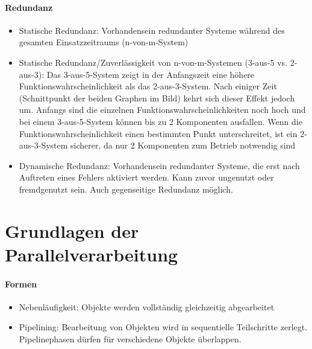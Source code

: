 	\paragraph{Redundanz}
		\begin{itemize}
			\item Statische Redundanz: Vorhandensein redundanter Systeme während des gesamten Einsatzzeitraums (n-von-m-System)
			\item Statische Redundanz/Zuverlässigkeit von n-von-m-Systemen (3-aus-5 vs. 2-aus-3): Das 3-aus-5-System zeigt in der Anfangszeit eine höhere Funktionswahrscheinlichkeit als das 2-aus-3-System. Nach einiger Zeit (Schnittpunkt der beiden Graphen im Bild) kehrt sich dieser Effekt jedoch um. Anfangs sind die einzelnen Funktionswahrscheinlichkeiten noch hoch und bei einem 3-aus-5-System können bis zu 2 Komponenten ausfallen. Wenn die Funktionswahrscheinlichkeit einen bestimmten Punkt unterschreitet, ist ein 2-aus-3-System sicherer, da nur 2 Komponenten zum Betrieb notwendig sind
			\item Dynamische Redundanz: Vorhandensein redundanter Systeme, die erst nach Auftreten eines Fehlers aktiviert werden. Kann zuvor ungenutzt oder fremdgenutzt sein. Auch gegenseitige Redundanz möglich.
		\end{itemize}


\section{Grundlagen der Parallelverarbeitung}
	\paragraph{Formen} 
		\begin{itemize}
			\item Nebenläufigkeit: Objekte werden vollständig gleichzeitig abgearbeitet
			\item Pipelining: Bearbeitung von Objekten wird in sequentielle Teilschritte zerlegt. Pipelinephasen dürfen für verschiedene Objekte überlappen.	
		\end{itemize}


